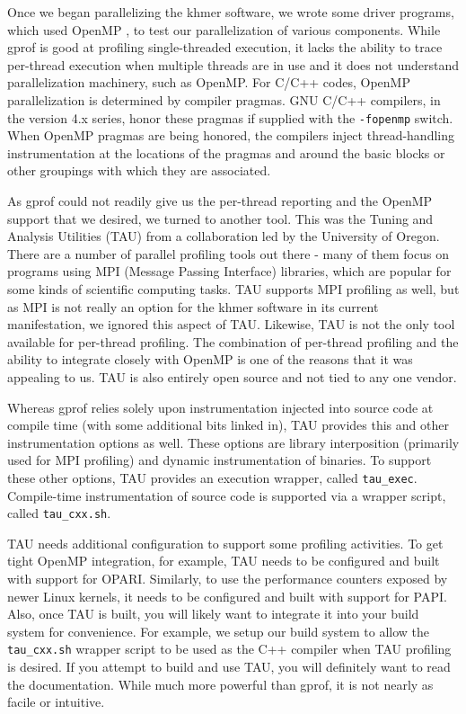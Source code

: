 \documentclass{article}
\begin{document}
Once we began parallelizing the khmer software, we wrote some driver programs,
which used OpenMP \citep{web:OpenMP}, to test our parallelization of various
components. While gprof is good at profiling single-threaded execution, it
lacks the ability to trace per-thread execution when multiple threads are in
use and it does not understand parallelization machinery, such as OpenMP. For
C/C++ codes, OpenMP parallelization is determined by compiler pragmas. GNU
C/C++ compilers, in the version 4.x series, honor these pragmas if supplied
with the \texttt{-fopenmp} switch. When OpenMP pragmas are being honored, the
compilers inject thread-handling instrumentation at the locations of the
pragmas and around the basic blocks or other groupings with which they are
associated.

As gprof could not readily give us the per-thread reporting and the OpenMP
support that we desired, we turned to another tool. This was the Tuning and
Analysis Utilities (TAU) \citep{web:TAU} from a collaboration led by the
University of Oregon. There are a number of parallel profiling tools out there
- many of them focus on programs using MPI (Message Passing Interface)
libraries, which are popular for some kinds of scientific computing tasks. TAU
supports MPI profiling as well, but as MPI is not really an option for the
khmer software in its current manifestation, we ignored this aspect of TAU.
Likewise, TAU is not the only tool available for per-thread profiling. The
combination of per-thread profiling and the ability to integrate closely with
OpenMP is one of the reasons that it was appealing to us. TAU is also entirely
open source and not tied to any one vendor.

Whereas gprof relies solely upon instrumentation injected into source code at
compile time (with some additional bits linked in), TAU provides this and other
instrumentation options as well. These options are library interposition
(primarily used for MPI profiling) and dynamic instrumentation of binaries. To
support these other options, TAU provides an execution wrapper, called
\texttt{tau\_exec}. Compile-time instrumentation of source code is supported
via a wrapper script, called \texttt{tau\_cxx.sh}.

TAU needs additional configuration to support some profiling activities.
To get tight OpenMP integration, for example, TAU needs to be
configured and built with support for OPARI. Similarly, to use the
performance counters exposed by newer Linux kernels, it needs to be
configured and built with support for PAPI. Also, once TAU is built,
you will likely want to integrate it into your build system for
convenience. For example, we setup our build system to allow the
\texttt{tau\_cxx.sh} wrapper script to be used as the C++ compiler
when TAU profiling is desired. If you attempt to build and use TAU,
you will definitely want to read the documentation. While much more
powerful than gprof, it is not nearly as facile or intuitive.
\end{document}
